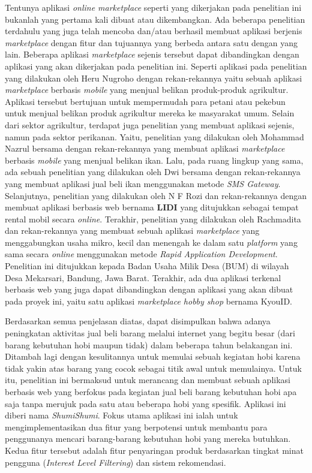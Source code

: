 \documentclass[a4paper]{article}
\begin{document}
Tentunya aplikasi \textit{online marketplace} seperti yang dikerjakan pada penelitian ini bukanlah yang pertama kali dibuat atau dikembangkan. Ada beberapa penelitian terdahulu yang juga telah mencoba dan/atau berhasil membuat aplikasi berjenis \textit{marketplace} dengan fitur dan tujuannya yang berbeda antara satu dengan yang lain. Beberapa aplikasi \textit{marketplace} sejenis tersebut dapat dibandingkan dengan aplikasi yang akan dikerjakan pada penelitian ini. Seperti aplikasi pada penelitian yang dilakukan oleh Heru Nugroho dengan rekan-rekannya yaitu sebuah aplikasi \textit{marketplace} berbasis \textit{mobile} yang menjual belikan produk-produk agrikultur. Aplikasi tersebut bertujuan untuk mempermudah para petani atau pekebun untuk menjual belikan produk agrikultur mereka ke masyarakat umum\autocite{agriculture-marketplace}. Selain dari sektor agrikultur, terdapat juga penelitian yang membuat aplikasi sejenis, namun pada sektor perikanan. Yaitu, penelitian yang dilakukan oleh Mohammad Nazrul bersama dengan rekan-rekannya yang membuat aplikasi \textit{marketplace} berbasis \textit{mobile} yang menjual belikan ikan\autocite[1-10]{fishes-marketplace}. Lalu, pada ruang lingkup yang sama, ada sebuah penelitian yang dilakukan oleh Dwi bersama dengan rekan-rekannya yang membuat aplikasi jual beli ikan menggunakan metode \textit{SMS Gateway}\autocite{c2c-fish-marketplace}. Selanjutnya, penelitian yang dilakukan oleh N F Rozi dan rekan-rekannya dengan membuat aplikasi berbasis web bernama \textbf{LIDI} yang ditujukkan sebagai tempat rental mobil secara \textit{online}\autocite{lidi-car-rental}. Terakhir, penelitian yang dilakukan oleh Rachmadita dan rekan-rekannya yang membuat sebuah aplikasi \textit{marketplace} yang menggabungkan usaha mikro, kecil dan menengah ke dalam satu \textit{platform} yang sama secara \textit{online} menggunakan metode \textit{Rapid Application Development}. Penelitian ini ditujukkan kepada Badan Usaha Milik Desa (BUM) di wilayah Desa Mekarsari, Bandung, Jawa Barat\autocite{bum-mekarsari}. Terakhir, ada dua aplikasi terkenal berbasis web yang juga dapat dibandingkan dengan aplikasi yang akan dibuat pada proyek ini, yaitu satu aplikasi \textit{marketplace hobby shop} bernama KyouID.

Berdasarkan semua penjelasan diatas, dapat disimpulkan bahwa adanya peningkatan aktivitas jual beli barang melalui internet yang begitu besar (dari barang kebutuhan hobi maupun tidak) dalam beberapa tahun belakangan ini. Ditambah lagi dengan kesulitannya untuk memulai sebuah kegiatan hobi karena tidak yakin atas barang yang cocok sebagai titik awal untuk memulainya. Untuk itu, penelitian ini bermaksud untuk merancang dan membuat sebuah aplikasi berbasis web yang berfokus pada kegiatan jual beli barang kebutuhan hobi apa saja tanpa merujuk pada satu atau beberapa hobi yang spesifik. Aplikasi ini diberi nama \textit{ShumiShumi}. Fokus utama aplikasi ini ialah untuk mengimplementasikan dua fitur yang berpotensi untuk membantu para penggunanya mencari barang-barang kebutuhan hobi yang mereka butuhkan. Kedua fitur tersebut adalah fitur penyaringan produk berdasarkan tingkat minat pengguna (\textit{Interest Level Filtering}) dan sistem rekomendasi.
\end{document}
